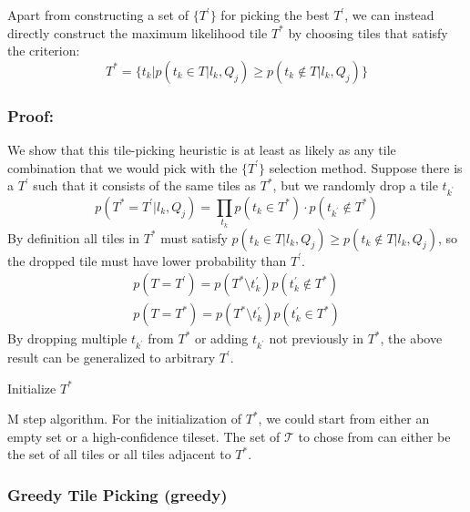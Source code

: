 \par Apart from constructing a set of  $\{T^{\prime}\}$ for picking the best  $T^{\prime}$, we can instead directly construct the maximum likelihood tile $T^*$ by choosing tiles that satisfy the criterion: 
\begin{equation}
T^* = \{t_k|p(t_k\in T|l_k,Q_j)\geq p(t_k\notin T|l_k,Q_j)\}
\end{equation}
\subsubsection{Proof:}
We show that this tile-picking heuristic is at least as likely as any tile combination that we would pick with the $\{T^{\prime}\}$ selection method. Suppose there is a $T^\prime$ such that it consists of the same tiles as $T^*$, but we randomly drop a tile $t_{k^\prime}$
\begin{equation}
p(T^*=T^\prime|l_k,Q_j)=\prod_{t_k} p(t_k\in T^*)\cdot p(t_{k^\prime}\notin T^*)
\end{equation}
By definition all tiles in $T^*$ must satisfy $p(t_k\in T|l_k,Q_j)\geq p(t_k\notin T|l_k,Q_j)$, so the dropped tile must have lower probability than $T^\prime$.
\begin{align}
p(T=T^\prime)=p(T^*\setminus t_k^\prime) p(t_k^\prime \notin T^*) \\
% 
% 
p(T=T^*)=p(T^*\setminus t_k^\prime) p(t_k^\prime \in T^*) 
\end{align}
By dropping multiple $t_{k^\prime}$ from $T^*$ or adding $t_{k^\prime}$ not previously in $T^*$, the above result can be generalized to arbitrary $T^\prime$.
\begin{algorithm}[ht!]
 Initialize $T^*$\;
 \caption{M step algorithm. For the initialization of $T^*$, we could start from either an empty set or a high-confidence tileset. The set of $\mathcal{T}$ to chose from can either be the set of all tiles or all tiles adjacent to $T^*$. }\label{Mstep}
\end{algorithm}

\subsubsection{Greedy Tile Picking (greedy)}

